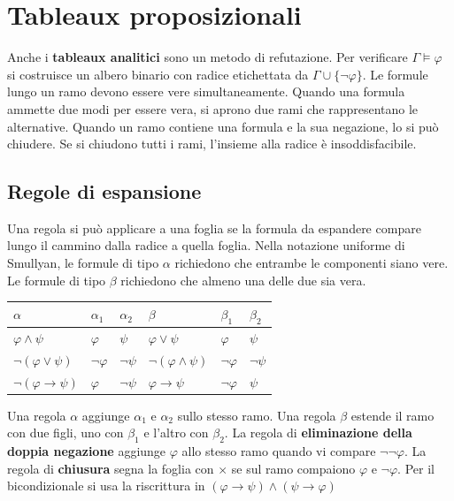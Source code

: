 \section{Tableaux proposizionali}
Anche i \textbf{tableaux analitici} sono un metodo di refutazione.
Per verificare $\Gamma\models\varphi$ si costruisce un albero
binario con radice etichettata da $\Gamma\cup\{\neg\varphi\}$.
Le formule lungo un ramo devono essere vere simultaneamente.
Quando una formula ammette due modi per essere vera, si aprono due
rami che rappresentano le alternative. Quando un ramo contiene una
formula e la sua negazione, lo si può chiudere. Se si chiudono tutti
i rami, l'insieme alla radice è insoddisfacibile.

\subsection{Regole di espansione}
Una regola si può applicare a una foglia se la formula da espandere
compare lungo il cammino dalla radice a quella foglia. Nella
notazione uniforme di Smullyan, le formule di tipo $\alpha$
richiedono che entrambe le componenti siano vere. Le formule di
tipo $\beta$ richiedono che almeno una delle due sia vera.

\begin{center}
\begin{tabular}{lll@{\qquad}lll}
    \toprule
    $\alpha$ & $\alpha_1$ & $\alpha_2$ &
    $\beta$ & $\beta_1$ & $\beta_2$\\
    \midrule
    $\varphi\wedge\psi$ & $\varphi$ & $\psi$ &
    $\varphi\vee\psi$ & $\varphi$ & $\psi$\\
    $\neg(\varphi\vee\psi)$ & $\neg\varphi$ & $\neg\psi$ &
    $\neg(\varphi\wedge\psi)$ & $\neg\varphi$ & $\neg\psi$\\
    $\neg(\varphi\to\psi)$ & $\varphi$ & $\neg\psi$ &
    $\varphi\to\psi$ & $\neg\varphi$ & $\psi$\\
    \bottomrule
\end{tabular}
\end{center}

\noindent
Una regola $\alpha$ aggiunge $\alpha_1$ e $\alpha_2$ sullo stesso
ramo. Una regola $\beta$ estende il ramo con due figli, uno con
$\beta_1$ e l'altro con $\beta_2$. La regola di
\textbf{eliminazione della doppia negazione} aggiunge $\varphi$
allo stesso ramo quando vi compare $\neg\neg\varphi$. La regola
di \textbf{chiusura} segna la foglia con $\times$ se sul ramo
compaiono $\varphi$ e $\neg\varphi$. Per il bicondizionale si usa
la riscrittura in $(\varphi\to\psi)\wedge(\psi\to\varphi)$

